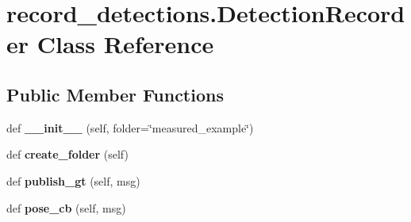 \hypertarget{classrecord__detections_1_1DetectionRecorder}{}\section{record\+\_\+detections.\+Detection\+Recorder Class Reference}
\label{classrecord__detections_1_1DetectionRecorder}
\subsection*{Public Member Functions}
\begin{DoxyCompactItemize}
\item 
\mbox{\label{classrecord__detections_1_1DetectionRecorder_aca47b8fcdfeaac048339d287a290152f}} 
def {\bfseries \+\_\+\+\_\+init\+\_\+\+\_\+} (self, folder=\char`\"{}measured\+\_\+example\char`\"{})
\item 
\mbox{\label{classrecord__detections_1_1DetectionRecorder_a88f28e3654908e93933ec31cbbbbe330}} 
def {\bfseries create\+\_\+folder} (self)
\item 
\mbox{\label{classrecord__detections_1_1DetectionRecorder_a3ad026866b5a1859c9083aa25bbbde1e}} 
def {\bfseries publish\+\_\+gt} (self, msg)
\item 
\mbox{\label{classrecord__detections_1_1DetectionRecorder_afa83950aadb1bbe1bf6a4c5bd5203d1b}} 
def {\bfseries pose\+\_\+cb} (self, msg)
\end{DoxyCompactItemize}
